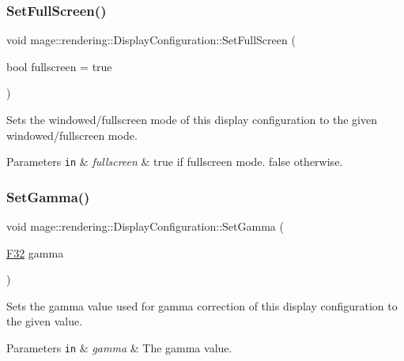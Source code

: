 \subsubsection{\texorpdfstring{Set\+Full\+Screen()}{SetFullScreen()}}
{\footnotesize\ttfamily void mage\+::rendering\+::\+Display\+Configuration\+::\+Set\+Full\+Screen (\begin{DoxyParamCaption}\item[{bool}]{fullscreen = {\ttfamily true} }\end{DoxyParamCaption})\hspace{0.3cm}{\ttfamily [noexcept]}}

Sets the windowed/fullscreen mode of this display configuration to the given windowed/fullscreen mode.


\begin{DoxyParams}[1]{Parameters}
\mbox{\tt in}  & {\em fullscreen} & {\ttfamily true} if fullscreen mode. {\ttfamily false} otherwise. \\
\hline
\end{DoxyParams}
\mbox{\label{classmage_1_1rendering_1_1_display_configuration_a1d8d4b2f3b79e53d9b36da3f6a0ddf69}} 
\subsubsection{\texorpdfstring{Set\+Gamma()}{SetGamma()}}
{\footnotesize\ttfamily void mage\+::rendering\+::\+Display\+Configuration\+::\+Set\+Gamma (\begin{DoxyParamCaption}\item[{\mbox{\hyperlink{namespacemage_aa97e833b45f06d60a0a9c4fc22ae02c0}{F32}}}]{gamma }\end{DoxyParamCaption})\hspace{0.3cm}{\ttfamily [noexcept]}}

Sets the gamma value used for gamma correction of this display configuration to the given value.


\begin{DoxyParams}[1]{Parameters}
\mbox{\tt in}  & {\em gamma} & The gamma value. \\
\hline
\end{DoxyParams}
\mbox{\label{classmage_1_1rendering_1_1_display_configuration_a304a29762afd99caa1672ef6cc259fb3}} 
